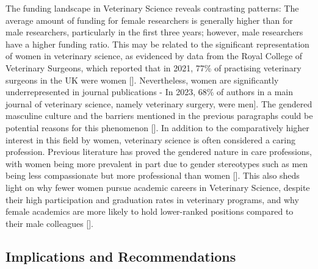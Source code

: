 The funding landscape in Veterinary Science reveals contrasting patterns: The average amount of funding for female researchers is generally higher than for male researchers, particularly in the first three years; however, male researchers have a higher funding ratio. This may be related to the significant representation of women in veterinary science, as evidenced by data from the Royal College of Veterinary Surgeons, which reported that in 2021, 77\% of practising veterinary surgeons in the UK were women [\cite{RCVS}]. Nevertheless, women are significantly underrepresented in journal publications - In 2023, 68\% of authors in a main journal of veterinary science, namely veterinary surgery, were men\cite{edinburgh_veterinary}]. The gendered masculine culture and the barriers mentioned in the previous paragraphs could be potential reasons for this phenomenon [\cite{liu2021women}]. In addition to the comparatively higher interest in this field by women, veterinary science is often considered a caring profession. Previous literature has proved the gendered nature in care professions, with women being more prevalent in part due to gender stereotypes such as men being less compassionate but more professional than women [\cite{poole1997caring}]. This also sheds light on why fewer women pursue academic careers in Veterinary Science, despite their high participation and graduation rates in veterinary programs, and why female academics are more likely to hold lower-ranked positions compared to their male colleagues [\cite{liu2021women}].
\\
\subsection{Implications and Recommendations}

